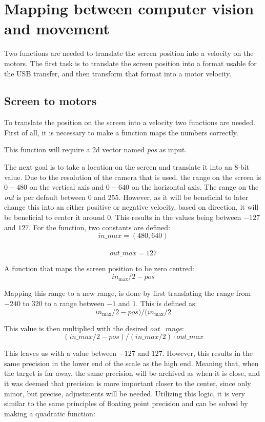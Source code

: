 \section{Mapping between computer vision and movement}
Two functions are needed to translate the screen position into a velocity on the motors.
The first task is to translate the screen position into a format usable for the USB transfer, and then transform that format into a motor velocity.

\subsection{Screen to motors}
To translate the position on the screen into a velocity two functions are needed.
First of all, it is necessary to make a function maps the numbers correctly.

This function will require a 2d vector named \textit{pos} as input.

The next goal is to take a location on the screen and translate it into an 8-bit value.
Due to the resolution of the camera that is used, the range on the screen is $0 - 480$ on the vertical axis and $0 - 640$ on the horizontal axis.
The range on the \textit{out}  is per default between 0 and 255.
However, as it will be beneficial to later change this into an either positive or negative velocity, based on direction, it will be beneficial to center it around 0.
This results in the values being between $-127$ and $127$.
For the function, two constants are defined:\\
$$in\_max = (480,640)$$\\
$$out\_max = 127$$

A function that maps the screen position to be zero centred: 
$$
in_\text{max}/2 - pos
$$

Mapping this range to a new range, is done by first translating the range from $-240$ to $320$ to a range between $-1$ and $1$.
This is defined as:
$$
in_\text{max}/2 - pos)/(in_\text{max}/2
$$


This value is then multiplied with the desired \textit{out\_range}:
$$
(in\_max/2 - pos)/(in\_max/2) \cdot out\_max
$$

This leaves us with a value between $-127$ and $127$. 
However, this results in the same precision in the lower end of the scale as the high end.
Meaning that, when the target is far away, the same precision will be archived as when it is close, and it was deemed that precision is more important closer to the center, since only minor, but precise, adjustments will be needed.
Utilizing this logic, it is very similar to the same principles of floating point precision and can be solved by making a quadratic function:

